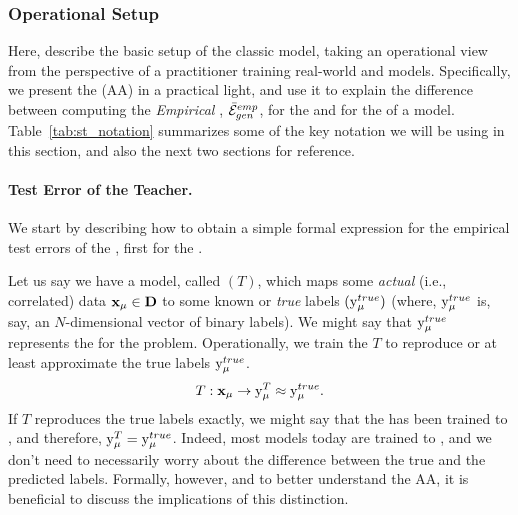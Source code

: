 \subsubsection{Operational Setup}
\label{sxn:ST_OP_setup}


Here, describe the basic setup of the classic \StudentTeacher model, taking an operational view from the perspective of a practitioner training real-world \Student and \Teacher models. Specifically, we present the \AnnealedApproximation (AA) in a practical light,
and use it to explain the difference between computing the \emph{Empirical \GeneralizationError}, $\bar{\mathcal{E}}^{emp}_{gen}$, for the \emph{\TrueAccuracy}
and for the \emph{\Precision} of a \Teacher model.
Table~\ref{tab:st_notation} summarizes some of the key notation we will be using in this section, and also the next two sections for reference.


\paragraph{Test Error of the Teacher.}
We start by describing how to obtain a simple formal expression for the empirical test errors of the \Teacher, first for the \TrueAccuracy. 

Let us say we have a model, called \Teacher $(T)$, which maps some \emph{actual} (i.e., correlated) data
$\mathbf{x}_{\mu}\in\mathbf{D}$ to some known or \emph{true} labels $(\mathrm{y}_{\mu}^{true})$
(where,  $\mathrm{y}_{\mu}^{true}$ is, say, an $N$-dimensional vector of binary labels).
We might say that $\mathrm{y}_{\mu}^{true}$ represents the \emph{\GroundTruth} for the problem.
Operationally, we train the \Teacher $T$ to reproduce or at least approximate the true labels $\mathrm{y}_{\mu}^{true}$.
\begin{align}
 T:\mathbf{x}_{\mu}\rightarrow \mathrm{y}_{\mu}^{T} \approx \mathrm{y}_{\mu}^{true}.
\end{align}
If $T$ reproduces the true labels exactly, we might say that the \Teacher has been
trained to \emph{\Interpolation}, and therefore, $\mathrm{y}_{\mu}^{T} = \mathrm{y}_{\mu}^{true}$.
Indeed, most models today are trained to \emph{\Interpolation}, and we don't need to
necessarily worry about the difference between the true and the predicted \Teacher labels.
Formally, however, and to better understand the AA, it is beneficial to discuss the implications
of this distinction.

